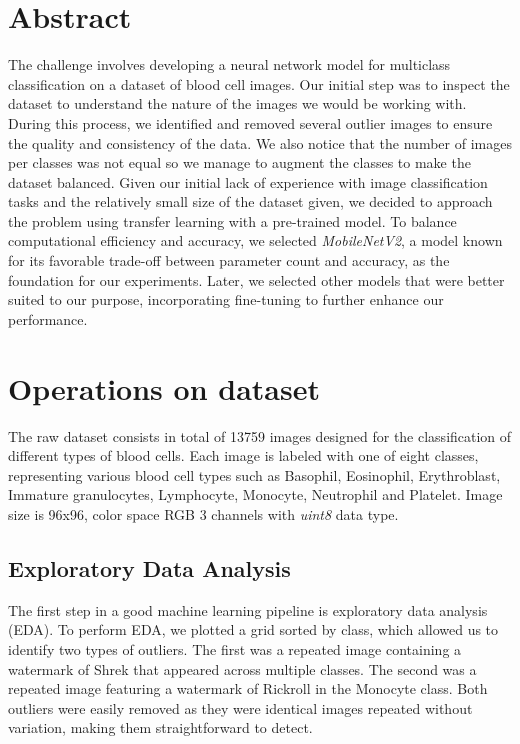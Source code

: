 \documentclass[11pt]{article}
\begin{document}
\section{Abstract}
The challenge involves developing a neural network model for multiclass classification on a dataset of blood cell images. Our initial step was to inspect the dataset to understand the nature of the images we would be working with. During this process, we identified and removed several outlier images to ensure the quality and consistency of the data. We also notice that the number of images per classes was not equal so we manage to augment the classes to make the dataset balanced. Given our initial lack of experience with image classification tasks and the relatively small size of the dataset given, we decided to approach the problem using transfer learning with a pre-trained model. To balance computational efficiency and accuracy, we selected \textit{MobileNetV2}, a model known for its favorable trade-off between parameter count and accuracy, as the foundation for our experiments. Later, we selected other models that were better suited to our purpose, incorporating fine-tuning to further enhance our performance.

\section{Operations on dataset}
The raw dataset consists in total of 13759 images designed for the classification of different types of blood cells. Each image is labeled with one of eight classes, representing various blood cell types such as Basophil, Eosinophil, Erythroblast,  Immature granulocytes, Lymphocyte, Monocyte, Neutrophil and Platelet. Image size is 96x96, color space RGB 3 channels with \textit{uint8} data type.

\subsection{Exploratory Data Analysis}
The first step in a good machine learning pipeline is exploratory data analysis (EDA). To perform EDA, we plotted a grid sorted by class, which allowed us to identify two types of outliers. The first was a repeated image containing a watermark of Shrek that appeared across multiple classes. The second was a repeated image featuring a watermark of Rickroll in the Monocyte class. Both outliers were easily removed as they were identical images repeated without variation, making them straightforward to detect.
\end{document}
